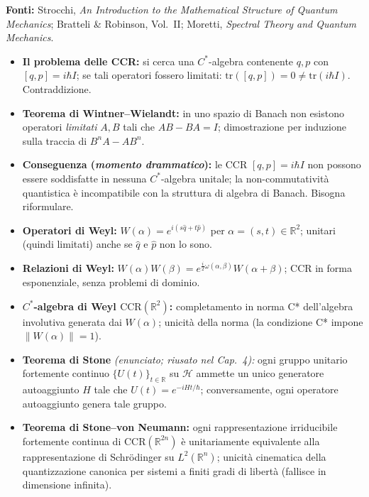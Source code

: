 \documentclass[12pt, a4paper]{article}
\newcommand{\fonti}[1]{%
	\begin{fontebox}
		\textcolor{fontecolor}{\footnotesize\textbf{Fonti:} #1}
	\end{fontebox}%
}
\begin{document}
	\fonti{Strocchi, \textit{An Introduction to the Mathematical Structure of Quantum
			Mechanics}; Bratteli \& Robinson, Vol.~II; Moretti, \textit{Spectral Theory
			and Quantum Mechanics}.}
	
	\begin{itemize}
		\item \textbf{Il problema delle CCR:} si cerca una $C^*$-algebra contenente $q, p$ con
		$[q, p] = i\hbar I$; se tali operatori fossero limitati:
		$\mathrm{tr}([q,p]) = 0 \neq \mathrm{tr}(i\hbar I)$. Contraddizione.
		\item \textbf{Teorema di Wintner--Wielandt:} in uno spazio di Banach non esistono
		operatori \emph{limitati} $A, B$ tali che $AB - BA = I$; dimostrazione per
		induzione sulla traccia di $B^n A - AB^n$.
		\item \textbf{Conseguenza (\textit{momento drammatico}):} le CCR $[q,p] = i\hbar I$
		non possono essere soddisfatte in nessuna $C^*$-algebra unitale; la non-commutatività
		quantistica è incompatibile con la struttura di algebra di Banach. Bisogna riformulare.
		\item \textbf{Operatori di Weyl:} $W(\alpha) = e^{i(s\hat{q} + t\hat{p})}$ per
		$\alpha = (s, t) \in \mathbb{R}^2$; unitari (quindi limitati) anche se $\hat{q}$
		e $\hat{p}$ non lo sono.
		\item \textbf{Relazioni di Weyl:} $W(\alpha)W(\beta) = e^{\frac{i}{2}\omega(\alpha,\beta)}
		W(\alpha + \beta)$; CCR in forma esponenziale, senza problemi di dominio.
		\item \textbf{$C^*$-algebra di Weyl $\mathrm{CCR}(\mathbb{R}^2)$:} completamento
		in norma C* dell'algebra involutiva generata dai $W(\alpha)$; unicità della norma
		(la condizione C* impone $\|W(\alpha)\| = 1$).
		\item \textbf{Teorema di Stone} \emph{(enunciato; riusato nel Cap.\ 4):} ogni gruppo
		unitario fortemente continuo $\{U(t)\}_{t \in \mathbb{R}}$ su $\mathcal{H}$ ammette
		un unico generatore autoaggiunto $H$ tale che $U(t) = e^{-iHt/\hbar}$; conversamente,
		ogni operatore autoaggiunto genera tale gruppo.
		\item \textbf{Teorema di Stone--von Neumann:} ogni rappresentazione irriducibile
		fortemente continua di $\mathrm{CCR}(\mathbb{R}^{2n})$ è unitariamente equivalente
		alla rappresentazione di Schrödinger su $L^2(\mathbb{R}^n)$; unicità cinematica
		della quantizzazione canonica per sistemi a finiti gradi di libertà (fallisce in
		dimensione infinita).
	\end{itemize}
	
\end{document}
